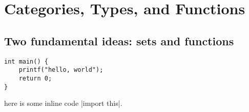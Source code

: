 \documentclass[12pt]{article}
\theoremstyle{definition}
\begin{document}
\tableofcontents
\section{Categories, Types, and Functions}
\subsection{Two fundamental ideas: sets and functions}

\begin{verbatim}
int main() {
    printf("hello, world");
    return 0;
}
\end{verbatim}

here is some inline code |import this|.


\printindex
\end{document}
